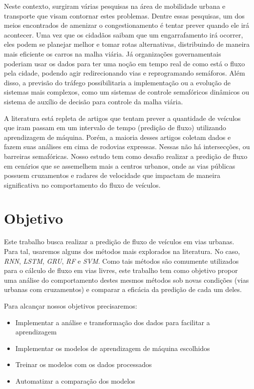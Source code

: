 Neste contexto, surgiram várias pesquisas na área de mobilidade urbana e transporte que visam contornar estes problemas. Dentre essas pesquisas, um dos meios encontrados de amenizar o congestionamento é tentar prever quando ele irá acontecer. Uma vez que os cidadãos saibam que um engarrafamento irá ocorrer, eles podem se planejar melhor e tomar rotas alternativas, distribuindo de maneira mais eficiente os carros na malha viária. Já organizações governamentais poderiam usar os dados para ter uma noção em tempo real de como está o fluxo pela cidade, podendo agir redirecionando vias e reprogramando semáforos. Além disso, a previsão do tráfego possibilitaria a implementação ou a evolução de sistemas mais complexos, como um sistemas de controle semafóricos dinâmicos ou sistema de auxílio de decisão para controle da malha viária.

A literatura está repleta de artigos que tentam prever a quantidade de veículos que iram passam em um intervalo de tempo (predição de fluxo) utilizando aprendizagem de máquina. Porém, a maioria desses artigos coletam dados e fazem suas análises em cima de rodovias expressas. Nessas não há intersecções, ou barreiras semafóricas. Nosso estudo tem como desafio realizar a predição de fluxo em cenários que se assemelhem mais a centros urbanos, onde as vias públicas possuem cruzamentos e radares de velocidade que impactam de maneira significativa no comportamento do fluxo de veículos.

\section{Objetivo}

Este trabalho busca realizar a predição de fluxo de veículos em vias urbanas. Para tal, usaremos alguns dos métodos mais explorados na literatura. No caso, \textit{\acrfull{RNN}}, \textit{\acrfull{LSTM}}, \textit{\acrfull{GRU}}, \textit{\acrfull{RF}} e \textit{\acrfull{SVM}}. Como tais métodos são comumente utilizados para o cálculo de fluxo em vias livres, este trabalho tem como objetivo propor uma análise do comportamento destes mesmos métodos sob novas condições (vias urbanas com cruzamentos) e comparar a eficácia da predição de cada um deles.

Para alcançar nossos objetivos precisaremos:

\begin{itemize}
    \item Implementar a análise e transformação dos dados para facilitar a aprendizagem
    \item Implementar os modelos de aprendizagem de máquina escolhidos 
    \item Treinar os modelos com os dados processados
    \item Automatizar a comparação dos modelos
\end{itemize}

